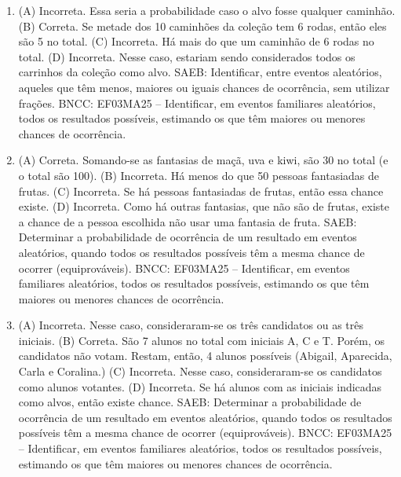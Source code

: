 \begin{enumerate}
\item
(A) Incorreta. Essa seria a probabilidade caso o alvo fosse qualquer caminhão.
(B) Correta. Se metade dos 10 caminhões da coleção tem 6 rodas, então eles são 5 no total.
(C) Incorreta. Há mais do que um caminhão de 6 rodas no total.
(D) Incorreta. Nesse caso, estariam sendo considerados todos os carrinhos da coleção como alvo.
SAEB: Identificar, entre eventos aleatórios, aqueles que têm menos, maiores ou iguais chances de ocorrência, sem utilizar frações. 
BNCC: EF03MA25 -- Identificar, em eventos familiares aleatórios, todos os resultados possíveis,
estimando os que têm maiores ou menores chances de ocorrência.

\item
(A) Correta. Somando-se as fantasias de maçã, uva e kiwi, são 30 no total (e o total são 100).
(B) Incorreta. Há menos do que 50 pessoas fantasiadas de frutas.
(C) Incorreta. Se há pessoas fantasiadas de frutas, então essa chance existe.
(D) Incorreta. Como há outras fantasias, que não são de frutas, existe a chance de a pessoa escolhida não usar uma fantasia de fruta.
SAEB: Determinar a probabilidade de ocorrência de um resultado em eventos aleatórios, quando todos os resultados possíveis têm a mesma chance de ocorrer (equiprováveis).  
BNCC: EF03MA25 -- Identificar, em eventos familiares aleatórios, todos os resultados possíveis,
estimando os que têm maiores ou menores chances de ocorrência.

\item
(A) Incorreta. Nesse caso, consideraram-se os três candidatos ou as três iniciais.
(B) Correta. São 7 alunos no total com iniciais A, C e T. Porém, os candidatos não votam. Restam, então, 4 alunos possíveis (Abigail, Aparecida, Carla e Coralina.)
(C) Incorreta. Nesse caso, consideraram-se os candidatos como alunos votantes.
(D) Incorreta. Se há alunos com as iniciais indicadas como alvos, então existe chance.
SAEB: Determinar a probabilidade de ocorrência de um resultado em eventos aleatórios, quando todos os resultados possíveis têm a mesma chance de ocorrer (equiprováveis). 
BNCC: EF03MA25 -- Identificar, em eventos familiares aleatórios, todos os resultados possíveis,
estimando os que têm maiores ou menores chances de ocorrência.
\end{enumerate}


